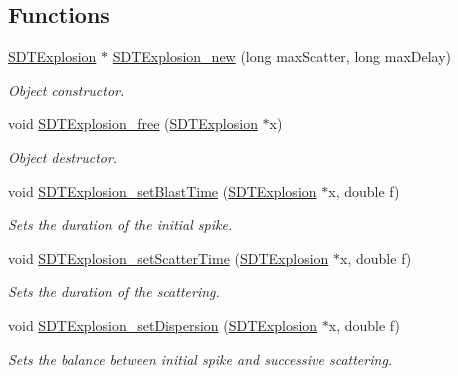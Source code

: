 \subsection*{Functions}
\begin{DoxyCompactItemize}
\item 
\hyperlink{group__explosions_ga9be74dfac803ba58938fa89367285343}{S\+D\+T\+Explosion} $\ast$ \hyperlink{group__explosions_gaedb86f6ec58cd642f6704542d44d8161}{S\+D\+T\+Explosion\+\_\+new} (long max\+Scatter, long max\+Delay)
\begin{DoxyCompactList}\small\item\em Object constructor. \end{DoxyCompactList}\item 
void \hyperlink{group__explosions_ga6627ef314c38d7dd804230dde4a455d2}{S\+D\+T\+Explosion\+\_\+free} (\hyperlink{group__explosions_ga9be74dfac803ba58938fa89367285343}{S\+D\+T\+Explosion} $\ast$x)
\begin{DoxyCompactList}\small\item\em Object destructor. \end{DoxyCompactList}\item 
void \hyperlink{group__explosions_ga28333314489e331e7b610c302e57d3c5}{S\+D\+T\+Explosion\+\_\+set\+Blast\+Time} (\hyperlink{group__explosions_ga9be74dfac803ba58938fa89367285343}{S\+D\+T\+Explosion} $\ast$x, double f)
\begin{DoxyCompactList}\small\item\em Sets the duration of the initial spike. \end{DoxyCompactList}\item 
void \hyperlink{group__explosions_ga309fc62b6cfcdf2c708beb845e22a2f9}{S\+D\+T\+Explosion\+\_\+set\+Scatter\+Time} (\hyperlink{group__explosions_ga9be74dfac803ba58938fa89367285343}{S\+D\+T\+Explosion} $\ast$x, double f)
\begin{DoxyCompactList}\small\item\em Sets the duration of the scattering. \end{DoxyCompactList}\item 
void \hyperlink{group__explosions_gafb2968fefaddd8499587fe0795986f67}{S\+D\+T\+Explosion\+\_\+set\+Dispersion} (\hyperlink{group__explosions_ga9be74dfac803ba58938fa89367285343}{S\+D\+T\+Explosion} $\ast$x, double f)
\begin{DoxyCompactList}\small\item\em Sets the balance between initial spike and successive scattering. \end{DoxyCompactList}\item 

\end{DoxyCompactItemize}

